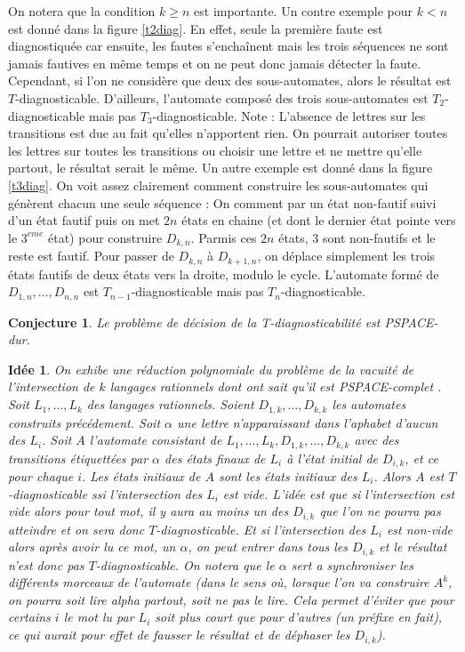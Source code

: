\documentclass[conference]{IEEEtran}
\newtheorem{myconj}{Conjecture}
\newtheorem{myid}{Idée}
\begin{document}
On notera que la condition $k\ge n$ est importante. Un contre exemple pour $k<n$ est donné dans la figure \ref{t2diag}. En effet, seule la première faute est diagnostiquée car ensuite, les fautes s'enchaînent mais les trois séquences ne sont jamais fautives en même temps et on ne peut donc jamais détecter la faute. Cependant, si l'on ne considère que deux des sous-automates, alors le résultat est $T$-diagnosticable. D'ailleurs, l'automate composé des trois sous-automates est $T_2$-diagnosticable mais pas $T_3$-diagnosticable. Note : L'absence de lettres sur les transitions est due au fait qu'elles n'apportent rien. On pourrait autoriser toutes les lettres sur toutes les transitions ou choisir une lettre et ne mettre qu'elle partout, le résultat serait le même. Un autre exemple est donné dans la figure \ref{t3diag}. On voit assez clairement comment construire les sous-automates qui génèrent chacun une seule séquence : On comment par un état non-fautif suivi d'un état fautif puis on met $2n$ états en chaine (et dont le dernier état pointe vers le $3^{eme}$ état) pour construire $D_{k,n}$. Parmis ces $2n$ états, $3$ sont non-fautifs et le reste est fautif. Pour passer de $D_{k,n}$ à $D_{k+1,n}$, on déplace simplement les trois états fautifs de deux états vers la droite, modulo le cycle. L'automate formé de $D_{1,n},\dots,D_{n,n}$ est $T_{n-1}$-diagnosticable mais pas $T_n$-diagnosticable.

\begin{myconj}
Le problème de décision de la T-diagnosticabilité est PSPACE-dur.
\end{myconj}

\begin{myid}
On exhibe une réduction polynomiale du problème de la vacuité de l'intersection de $k$ langages rationnels dont ont sait qu'il est PSPACE-complet \cite{Lange92theemptiness}. Soit $L_1, \dots, L_k$ des langages rationnels. Soient $D_{1,k},\dots, D_{k,k}$ les automates construits précédement. Soit $\alpha$ une lettre n'apparaissant dans l'aphabet d'aucun des $L_i$. Soit $A$ l'automate consistant de $L_1, \dots, L_k, D_{1,k},\dots, D_{k,k}$ avec des transitions étiquettées par $\alpha$ des états finaux de $L_i$ à l'état initial de $D_{i,k}$, et ce pour chaque $i$. Les états initiaux de $A$ sont les états initiaux des $L_i$. Alors $A$ est $T$-diagnosticable ssi l'intersection des $L_i$ est vide. L'idée est que si l'intersection est vide alors pour tout mot, il y aura au moins un des $D_{i,k}$ que l'on ne pourra pas atteindre et on sera donc $T$-diagnosticable. Et si l'intersection des $L_i$ est non-vide alors après avoir lu ce mot, un $\alpha$, on peut entrer dans tous les $D_{i,k}$ et le résultat n'est donc pas $T$-diagnosticable. On notera que le $\alpha$ sert a synchroniser les différents morceaux de l'automate (dans le sens où, lorsque l'on va construire $A^k$, on pourra soit lire alpha partout, soit ne pas le lire.  Cela permet d'éviter que pour certains $i$ le mot lu par $L_i$ soit plus court que pour d'autres (un préfixe en fait), ce qui aurait pour effet de fausser le résultat et de déphaser les $D_{i,k}$).
\end{myid}
\end{document}
